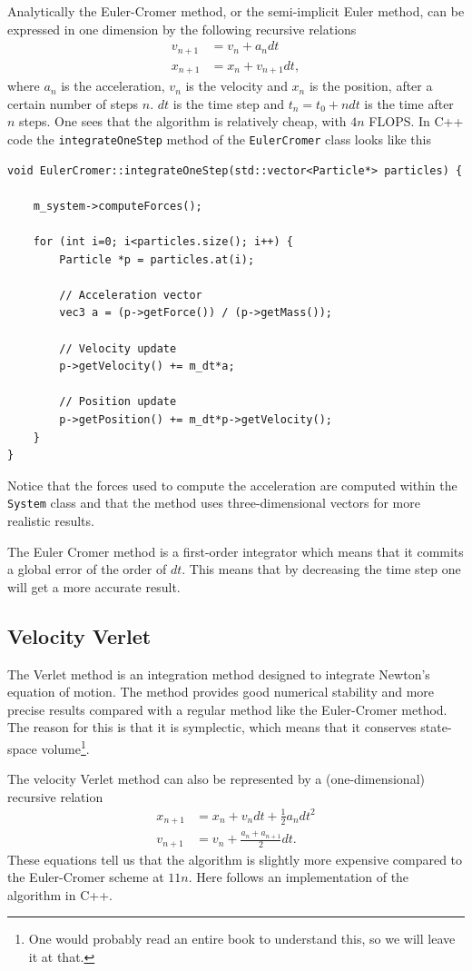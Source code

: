 \documentclass[10pt,a4paper]{amsart}
\begin{document}
Analytically the Euler-Cromer method, or the semi-implicit Euler method, can be expressed in one dimension by the following recursive relations
\begin{align}
v_{n+1} &= v_n + a_n dt \\
x_{n+1} &= x_n + v_{n+1} dt,
\end{align}
where $a_n$ is the acceleration, $v_n$ is the velocity and $x_n$ is the position, after a certain number of steps $n$. $dt$ is the time step and $t_n = t_0 + ndt$ is the time after $n$ steps. One sees that the algorithm is relatively cheap, with $4n$ FLOPS. In C++ code the \lstinline|integrateOneStep| method of the \lstinline|EulerCromer| class looks like this
\begin{lstlisting}
void EulerCromer::integrateOneStep(std::vector<Particle*> particles) {

	m_system->computeForces();
    
	for (int i=0; i<particles.size(); i++) {
		Particle *p = particles.at(i);

		// Acceleration vector
		vec3 a = (p->getForce()) / (p->getMass());
        
		// Velocity update
		p->getVelocity() += m_dt*a;

		// Position update
		p->getPosition() += m_dt*p->getVelocity();
	}
}
\end{lstlisting}
Notice that the forces used to compute the acceleration are computed within the \lstinline|System| class and that the method uses three-dimensional vectors for more realistic results.

The Euler Cromer method is a first-order integrator which means that it commits a global error of the order of $dt$. This means that by decreasing the time step one will get a more accurate result.

\subsection{Velocity Verlet}
The Verlet method is an integration method designed to integrate Newton's equation of motion. The method provides good numerical stability and more precise results compared with a regular method like the Euler-Cromer method. The reason for this is that it is symplectic, which means that it conserves state-space volume\footnote{One would probably read an entire book to understand this, so we will leave it at that.}.

The velocity Verlet method can also be represented by a (one-dimensional) recursive relation
\begin{align}
x_{n+1} &= x_n + v_ndt + \frac{1}{2}a_ndt^2 \\
v_{n+1} &= v_n + \frac{a_n + a_{n+1}}{2}dt.
\end{align}
These equations tell us that the algorithm is slightly more expensive compared to the Euler-Cromer scheme at $11n$. Here follows an implementation of the algorithm in C++.
\end{document}
